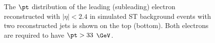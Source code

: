 \begin{figure}[btp]
	\centering
	\label{fig:bkgLeptonPts}
	\caption{The $\pt$ distribution of the leading (subleading) electron reconstructed with $|\eta| < 2.4$ in simulated ST background events 
		with two reconstructed jets is shown on the top (bottom).  Both electrons are required to have $\pt > 33$ $\GeV$.}
\end{figure}

